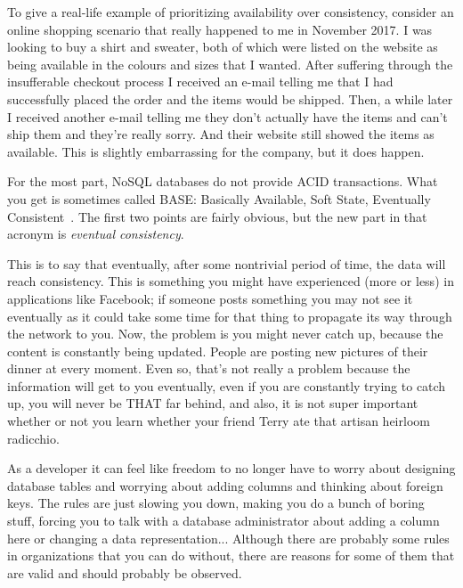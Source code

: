 To give a real-life example of prioritizing availability over consistency, consider an online shopping scenario that really happened to me in November 2017. I was looking to buy a shirt and sweater, both of which were listed on the website as being available in the colours and sizes that I wanted. After suffering through the insufferable checkout process I received an e-mail telling me that I had successfully placed the order and the items would be shipped. Then, a while later I received another e-mail telling me they don't actually have the items and can't ship them and they're really sorry. And their website still showed the items as available. This is slightly embarrassing for the company, but it does happen.

For the most part, NoSQL databases do not provide ACID transactions. What you get is sometimes called BASE: Basically Available, Soft State, Eventually Consistent~\cite{oraclenosql}.  The first two points are fairly obvious, but the new part in that acronym is \textit{eventual consistency}.

This is to say that eventually, after some nontrivial period of time, the data will reach consistency. This is something you might have experienced (more or less) in applications like Facebook; if someone posts something you may not see it eventually as it could take some time for that thing to propagate its way through the network to you. Now, the problem is you might never catch up, because the content is constantly being updated. People are posting new pictures of their dinner at every moment. Even so, that's not really a problem because the information will get to you eventually, even if you are constantly trying to catch up, you will never be THAT far behind, and also, it is not super important whether or not you learn whether your friend Terry ate that artisan heirloom radicchio.

As a developer it can feel like freedom to no longer have to worry about designing database tables and worrying about adding columns and thinking about foreign keys. The rules are just slowing you down, making you do a bunch of boring stuff, forcing you to talk with a database administrator about adding a column here or changing a data representation... Although there are probably some rules in organizations that you can do without, there are reasons for some of them that are valid and should probably be observed.

